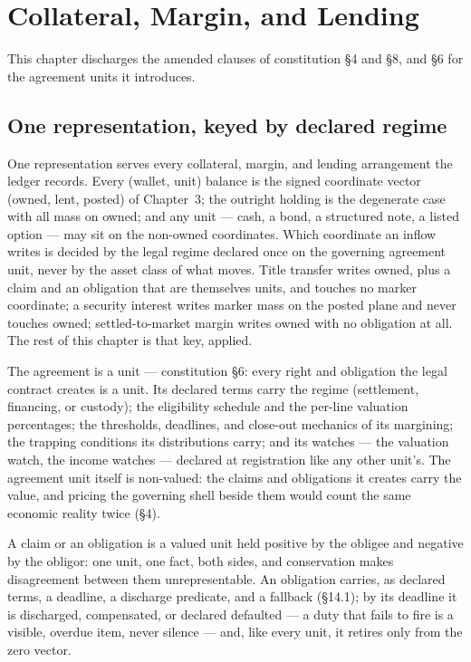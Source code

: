 
\section{Collateral, Margin, and Lending}\label{ch:collateral}

This chapter discharges the amended clauses of constitution \S4 and \S8, and \S6
for the agreement units it introduces.

\subsection{One representation, keyed by declared regime}

One representation serves every collateral, margin, and lending arrangement the
ledger records. Every (wallet, unit) balance is the signed coordinate vector
(owned, lent, posted) of Chapter~3; the outright holding is the degenerate case
with all mass on owned; and any unit --- cash, a bond, a structured note, a
listed option --- may sit on the non-owned coordinates. Which coordinate an
inflow writes is decided by the legal regime declared once on the governing
agreement unit, never by the asset class of what moves. Title transfer writes
owned, plus a claim and an obligation that are themselves units, and touches no
marker coordinate; a security interest writes marker mass on the posted plane
and never touches owned; settled-to-market margin writes owned with no
obligation at all. The rest of this chapter is that key, applied.

The agreement is a unit --- constitution \S6: every right and obligation the
legal contract creates is a unit. Its declared terms carry the regime
(settlement, financing, or custody); the eligibility schedule and the per-line
valuation percentages; the thresholds, deadlines, and close-out mechanics of
its margining; the trapping conditions its distributions carry; and its
watches --- the valuation watch, the income watches --- declared at
registration like any other unit's. The agreement unit itself is non-valued:
the claims and obligations it creates carry the value, and pricing the
governing shell beside them would count the same economic reality twice
(\S4).

A claim or an obligation is a valued unit held positive by the obligee and
negative by the obligor: one unit, one fact, both sides, and conservation makes
disagreement between them unrepresentable. An obligation carries, as declared
terms, a deadline, a discharge predicate, and a fallback (\S14.1); by its
deadline it is discharged, compensated, or declared defaulted --- a duty that
fails to fire is a visible, overdue item, never silence --- and, like every
unit, it retires only from the zero vector.

